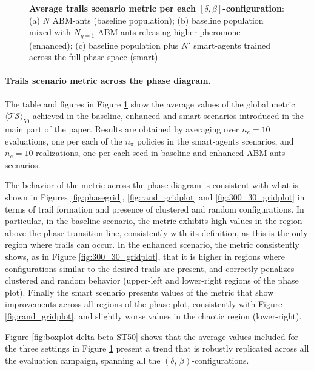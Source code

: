 \begin{figure}[t]
\begin{minipage}{0.3\textwidth}
    \end{minipage}
    \vspace{0.2cm}
    \caption{\textbf{Average trails scenario metric per each $[\delta, \beta]$-configuration}: (a) $N$ ABM-ants (baseline population); (b) baseline population mixed with $N_{\eta=1}$ ABM-ants releasing higher pheromone (enhanced); (c) baseline population plus $N'$ smart-agents trained across the full phase space (smart).}
    \label{fig:global50_metric}
\end{figure}

\paragraph{Trails scenario metric across the phase diagram.}
The table and figures in Figure \ref{fig:global50_metric} show the average values of the global metric $\langle \mathcal{TS} \rangle_{50}$ achieved in the baseline, enhanced and smart scenarios introduced in the main part of the paper. Results are obtained by averaging over $n_{e} = 10$ evaluations, one per each of the $n_{\pi}$ policies in the smart-agents scenarios, and $n_{e} = 10$ realizations, one per each seed in baseline and enhanced ABM-ants scenarios. 

The behavior of the metric across the phase diagram is consistent with what is shown in Figures \ref{fig:phasegrid}, \ref{fig:rand_gridplot} and \ref{fig:300_30_gridplot} in terms of trail formation and presence of clustered and random configurations. In particular, in the baseline scenario, the metric exhibits high values in the region above the phase transition line, consistently with its definition, as this is the only region where trails can occur. In the enhanced scenario, the metric consistently shows, as in Figure \ref{fig:300_30_gridplot}, that it is higher in regions where configurations similar to the desired trails are present, and correctly penalizes clustered and random behavior (upper-left and lower-right regions of the phase plot). Finally the smart scenario presents values of the  metric that show improvements across all regions of the phase plot, consistently with Figure \ref{fig:rand_gridplot}, and slightly worse values in the chaotic region (lower-right).

Figure \ref{fig:boxplot-delta-beta-ST50} shows that the average values included for the three settings in Figure \ref{fig:global50_metric} present a trend that is robustly replicated across all the evaluation campaign, spanning all the $(\delta, \, \beta)$-configurations.

